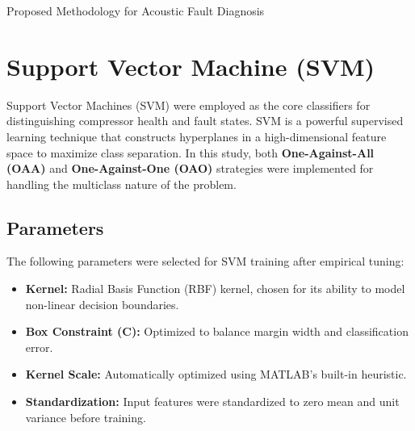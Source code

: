 \documentclass[12pt,a4paper]{article}
\begin{document}
\begin{multicols}{2}

\begin{algorithm}[H]
\caption{Proposed Methodology for Acoustic Fault Diagnosis}

\end{algorithm}


\section{Support Vector Machine (SVM)}
\label{sec:classification}


Support Vector Machines (SVM) were employed as the core classifiers for distinguishing compressor health and fault states. SVM is a powerful supervised learning technique that constructs hyperplanes in a high-dimensional feature space to maximize class separation. In this study, both \textbf{One-Against-All (OAA)} and \textbf{One-Against-One (OAO)} strategies were implemented for handling the multiclass nature of the problem.

\subsection*{Parameters}
The following parameters were selected for SVM training after empirical tuning:
\begin{itemize}
    \item \textbf{Kernel:} Radial Basis Function (RBF) kernel, chosen for its ability to model non-linear decision boundaries.
    \item \textbf{Box Constraint (C):} Optimized to balance margin width and classification error.
    \item \textbf{Kernel Scale:} Automatically optimized using MATLAB’s built-in heuristic.
    \item \textbf{Standardization:} Input features were standardized to zero mean and unit variance before training.
\end{itemize}


\end{multicols}
\end{document}
